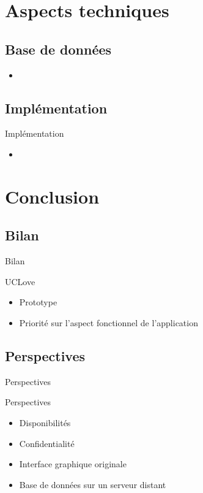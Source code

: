 \documentclass{beamer}
\begin{document}
\section{Aspects techniques}

\subsection{Base de données}

\begin{frame}
    \begin{itemize}
        \item{}
    \end{itemize}  
\end{frame}

\subsection{Implémentation}
\begin{frame}{Implémentation}
  \begin{itemize}
      \item{}
  \end{itemize}
\end{frame}

\section{Conclusion}

\subsection{Bilan}
\begin{frame}{Bilan}
\begin{block}{UCLove}
    \begin{itemize}
        \item{
            Prototype
        }
        \item{
            Priorité sur l'aspect fonctionnel de l'application
        }
    \end{itemize}
\end{block}
\end{frame}

\subsection{Perspectives}
\begin{frame}{Perspectives}
\begin{block}{Perspectives}
	\begin{itemize}
		\item{
			Disponibilités
		}
		\item{
			Confidentialité
		}
		\item{
			Interface graphique originale
		}
		\item{
			Base de données sur un serveur distant
		}
	\end{itemize}
\end{block}
\end{frame}
\end{document}
